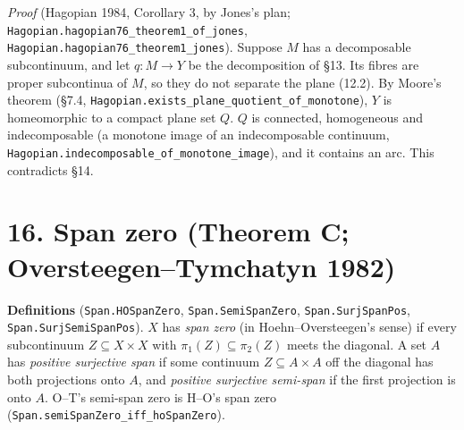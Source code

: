 \documentclass[11pt]{article}
\newcommand{\lean}[1]{\texttt{#1}}
\begin{document}
\emph{Proof} (Hagopian 1984, Corollary 3, by Jones's plan; \lean{Hagopian.\hspace{0pt}hagopian76\_\hspace{0pt}theorem1\_\hspace{0pt}of\_\hspace{0pt}jones}, \lean{Hagopian.\hspace{0pt}hagopian76\_\hspace{0pt}theorem1\_\hspace{0pt}jones}). Suppose $M$ has a decomposable subcontinuum, and let $q : M \to Y$ be the decomposition of \S{}13. Its fibres are proper subcontinua of $M$, so they do not separate the plane (12.2). By Moore's theorem (\S{}7.4, \lean{Hagopian.\hspace{0pt}exists\_\hspace{0pt}plane\_\hspace{0pt}quotient\_\hspace{0pt}of\_\hspace{0pt}monotone}), $Y$ is homeomorphic to a compact plane set $Q$. $Q$ is connected, homogeneous and indecomposable (a monotone image of an indecomposable continuum, \lean{Hagopian.\hspace{0pt}indecomposable\_\hspace{0pt}of\_\hspace{0pt}monotone\_\hspace{0pt}image}), and it contains an arc. This contradicts \S{}14.

\section*{16. Span zero (Theorem C; Oversteegen--Tymchatyn 1982)}

\textbf{Definitions} (\lean{Span.\hspace{0pt}HOSpanZero}, \lean{Span.\hspace{0pt}SemiSpanZero}, \lean{Span.\hspace{0pt}SurjSpanPos}, \lean{Span.\hspace{0pt}SurjSemiSpanPos}). $X$ has \emph{span zero} (in Hoehn--Oversteegen's sense) if every subcontinuum $Z \subseteq X \times X$ with $\pi_1(Z) \subseteq \pi_2(Z)$ meets the diagonal. A set $A$ has \emph{positive surjective span} if some continuum $Z \subseteq A \times A$ off the diagonal has both projections onto $A$, and \emph{positive surjective semi-span} if the first projection is onto $A$. O--T's semi-span zero is H--O's span zero (\lean{Span.\hspace{0pt}semiSpanZero\_\hspace{0pt}iff\_\hspace{0pt}hoSpanZero}).
\end{document}
